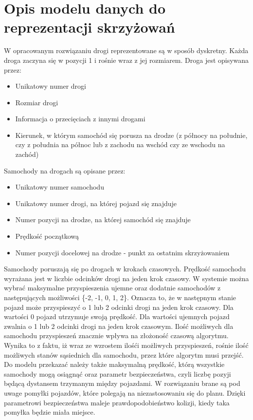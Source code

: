  \label{chap:implementation}

\section{Opis modelu danych do reprezentacji skrzyżowań}

W opracowanym rozwiązaniu drogi reprezentowane są w sposób dyskretny. Każda droga zaczyna się w pozycji 1 i rośnie wraz z jej rozmiarem. Droga jest opisywana przez:
\begin{itemize}
\item Unikatowy numer drogi
\item Rozmiar drogi
\item Informacja o przecięciach z innymi drogami
\item Kierunek, w którym samochód się porusza na drodze (z północy na południe, czy z południa na północ lub z zachodu na wschód czy ze wschodu na zachód)
\end{itemize}
Samochody na drogach są opisane przez:
\begin{itemize}
\item Unikatowy numer samochodu
\item Unikatowy numer drogi, na której pojazd się znajduje
\item Numer pozycji na drodze, na której samochód się znajduje
\item Prędkość początkową
\item Numer pozycji docelowej na drodze - punkt za ostatnim skrzyżowaniem
\end{itemize}
Samochody poruszają się po drogach w krokach czasowych. Prędkość samochodu wyrażana jest w liczbie odcinków drogi na jeden krok czasowy.
\newline
\indent
W systemie można wybrać maksymalne przyspieszenia ujemne oraz dodatnie samochodów z następujących możliwości \{-2, -1, 0, 1, 2\}. Oznacza to, że w następnym stanie pojazd może przyspieszyć o 1 lub 2 odcinki drogi na jeden krok czasowy. Dla wartości 0 pojazd utrzymuje swoją prędkość. Dla wartości ujemnych pojazd zwalnia o 1 lub 2 odcinki drogi na jeden krok czasowym. Ilość możliwych dla samochodu przyspieszeń znacznie wpływa na złożoność czasową algorytmu. Wynika to z faktu, iż wraz ze wzrostem ilośći możliwych przyspieszeń, rośnie ilość możliwych stanów sąsiednich dla samochodu, przez które algorytm musi przejść.        
\newline
\indent
Do modelu przekazać należy także maksymalną prędkość, którą wszystkie samochody mogą osiągnąć oraz parametr bezpieczeństwa, czyli liczbę pozyji będącą dystansem trzymanym między pojazdami. W rozwiązaniu brane są pod uwage pomyłki pojazdów, które polegają na niezastosowaniu się do planu. Dzięki parametrowi bezpieczeństwa maleje prawdopodobieństwo kolizji, kiedy taka pomyłka będzie miała miejsce.

